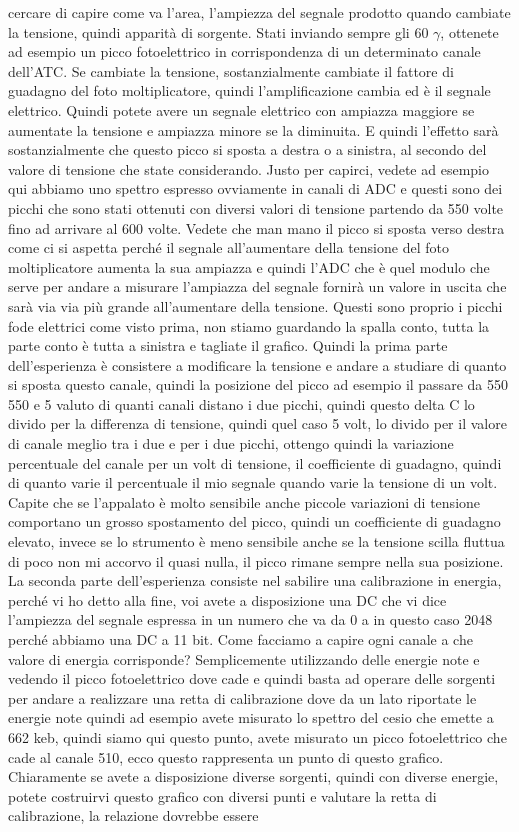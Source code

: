 {cercare di capire come va l'area, l'ampiezza del segnale prodotto quando cambiate la tensione, quindi apparità di sorgente. Stati inviando sempre gli 60 $\gamma$, ottenete ad esempio un picco fotoelettrico in corrispondenza di un determinato canale dell'ATC. Se cambiate la tensione, sostanzialmente cambiate il fattore di guadagno del foto moltiplicatore, quindi l'amplificazione cambia ed è il segnale elettrico. Quindi potete avere un segnale elettrico con ampiazza maggiore se aumentate la tensione e ampiazza minore se la diminuita. E quindi l'effetto sarà sostanzialmente che questo picco si sposta a destra o a sinistra, al secondo del valore di tensione che state considerando. Justo per capirci, vedete ad esempio qui abbiamo uno spettro espresso ovviamente in canali di ADC e questi sono dei picchi che sono stati ottenuti con diversi valori di tensione partendo da 550 volte fino ad arrivare al 600 volte. Vedete che man mano il picco si sposta verso destra come ci si aspetta perché il segnale all'aumentare della tensione del foto moltiplicatore aumenta la sua ampiazza e quindi l'ADC che è quel modulo che serve per andare a misurare l'ampiazza del segnale fornirà un valore in uscita che sarà via via più grande all'aumentare della tensione. Questi sono proprio i picchi fode elettrici come visto prima, non stiamo guardando la spalla conto, tutta la parte conto è tutta a sinistra e tagliate il grafico. Quindi la prima parte dell'esperienza è consistere a modificare la tensione e andare a studiare di quanto si sposta questo canale, quindi la posizione del picco ad esempio il passare da 550 550 e 5 valuto di quanti canali distano i due picchi, quindi questo delta C lo divido per la differenza di tensione, quindi quel caso 5 volt, lo divido per il valore di canale meglio tra i due e per i due picchi, ottengo quindi la variazione percentuale del canale per un volt di tensione, il coefficiente di guadagno, quindi di quanto varie il percentuale il mio segnale quando varie la tensione di un volt. Capite che se l'appalato è molto sensibile anche piccole variazioni di tensione comportano un grosso spostamento del picco, quindi un coefficiente di guadagno elevato, invece se lo strumento è meno sensibile anche se la tensione scilla fluttua di poco non mi accorvo il quasi nulla, il picco rimane sempre nella sua posizione. La seconda parte dell'esperienza consiste nel sabilire una calibrazione in energia, perché vi ho detto alla fine, voi avete a disposizione una DC che vi dice l'ampiezza del segnale espressa in un numero che va da 0 a in questo caso 2048 perché abbiamo una DC a 11 bit. Come facciamo a capire ogni canale a che valore di energia corrisponde? Semplicemente utilizzando delle energie note e vedendo il picco fotoelettrico dove cade e quindi basta ad operare delle sorgenti per andare a realizzare una retta di calibrazione dove da un lato riportate le energie note quindi ad esempio avete misurato lo spettro del cesio che emette a 662 keb, quindi siamo qui questo punto, avete misurato un picco fotoelettrico che cade al canale 510, ecco questo rappresenta un punto di questo grafico. Chiaramente se avete a disposizione diverse sorgenti, quindi con diverse energie, potete costruirvi questo grafico con diversi punti e valutare la retta di calibrazione, la relazione dovrebbe essere }
